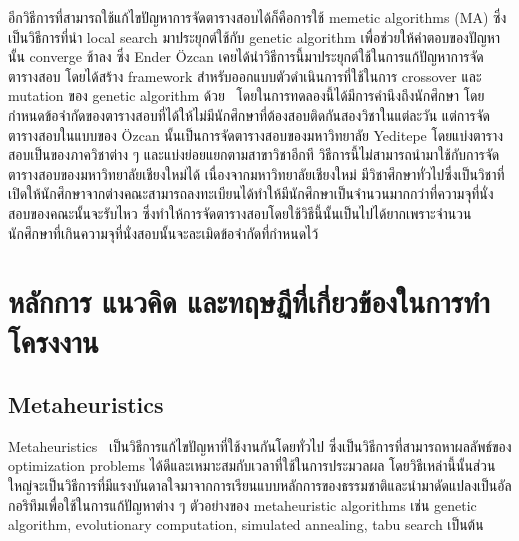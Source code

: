 อีกวิธีการที่สามารถใช้แก้ไขปัญหาการจัดตารางสอบได้ก็คือการใช้ memetic algorithms (MA) ซึ่งเป็นวิธีการที่นำ local search มาประยุกต์ใช้กับ genetic algorithm 
เพื่อช่วยให้คำตอบของปัญหานั้น converge ช้าลง \cite{pablo-memetic-algo} ซึ่ง Ender {\"O}zcan เคยได้นำวิธีการนี้มาประยุกต์ใช้ในการแก้ปัญหาการจัดตารางสอบ 
โดยได้สร้าง framework สำหรับออกแบบตัวดำเนินการที่ใช้ในการ crossover และ mutation ของ genetic algorithm ด้วย~\cite{fes}
โดยในการทดลองนี้ได้มีการคำนึงถึงนักศึกษา โดยกำหนดข้อจำกัดของตารางสอบที่ได้ให้ไม่มีนักศึกษาที่ต้องสอบติดกันสองวิชาในแต่ละวัน แต่การจัดตารางสอบในแบบของ {\"O}zcan 
นั้นเป็นการจัดตารางสอบของมหาวิทยาลัย Yeditepe โดยแบ่งตารางสอบเป็นของภาควิชาต่าง ๆ และแบ่งย่อยแยกตามสาขาวิชาอีกที วิธีการนี้ไม่สามารถนำมาใช้กับการจัดตารางสอบของมหาวิทยาลัยเชียงใหม่ได้
เนื่องจากมหาวิทยาลัยเชียงใหม่ มีวิชาศึกษาทั่วไปซึ่งเป็นวิชาที่เปิดให้นักศึกษาจากต่างคณะสามารถลงทะเบียนได้ทำให้มีนักศึกษาเป็นจำนวนมากกว่าที่ความจุที่นั่งสอบของคณะนั้นจะรับไหว
ซึ่งทำให้การจัดตารางสอบโดยใช้วิธีนี้นั้นเป็นไปได้ยากเพราะจำนวนนักศึกษาที่เกินความจุที่นั่งสอบนั้นจะละเมิดข้อจำกัดที่กำหนดไว้ 

\section{หลักการ แนวคิด และทฤษฏีที่เกี่ยวข้องในการทำโครงงาน }
\subsection{Metaheuristics}
Meta­heuristics~\cite{metaheuris} เป็นวิธีการแก้ไขปัญหาที่ใช้งานกันโดยทั่วไป ซึ่งเป็นวิธีการที่สามารถหาผลลัพธ์ของ optimization problems ได้ดีและเหมาะสมกับเวลาที่ใช้ในการประมวลผล
โดยวิธีเหล่านี้นั้นส่วนใหญ่จะเป็นวิธีการที่มีแรงบันดาลใจมาจากการเรียนแบบหลักการของธรรมชาติและนำมาดัดแปลงเป็นอัลกอริทึมเพื่อใช้ในการแก้ปัญหาต่าง ๆ ตัวอย่างของ metaheuristic algorithms เช่น genetic algorithm, evolutionary computation, simulated annealing, tabu search เป็นต้น
